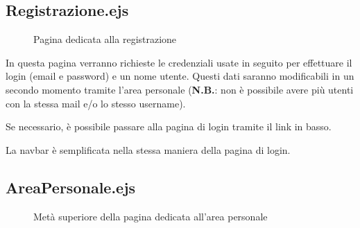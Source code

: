 \subsection{Registrazione.ejs}

\begin{figure}[ht]
    \centering
    \caption{Pagina dedicata alla registrazione}
\end{figure}

In questa pagina verranno richieste le credenziali usate in seguito per effettuare il login (email e password) e un nome utente.
Questi dati saranno modificabili in un secondo momento tramite l'area personale (\textbf{N.B.}: non è possibile avere più utenti con
la stessa mail e/o lo stesso username).\\

\vspace{5mm}

Se necessario, è possibile passare alla pagina di login tramite il link in basso.\\

\vspace{5mm}

La navbar è semplificata nella stessa maniera della pagina di login.

\subsection{AreaPersonale.ejs}

\begin{figure}[ht]
    \centering
    \caption{Metà superiore della pagina dedicata all'area personale}
\end{figure}

